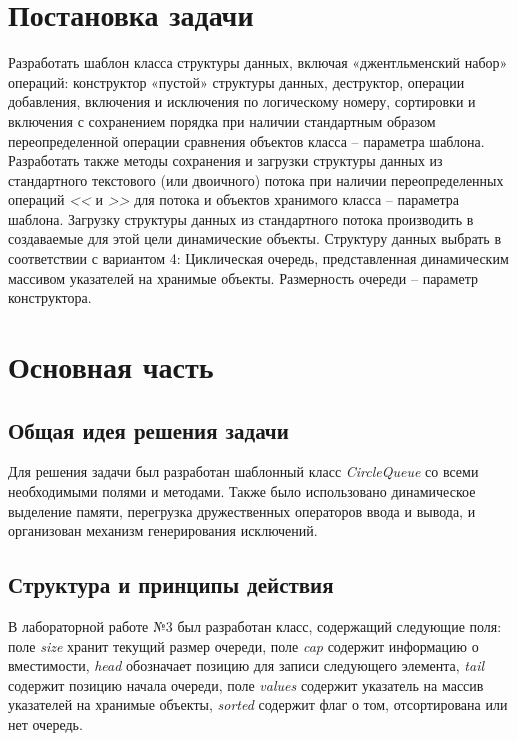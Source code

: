 \documentclass[a4paper,14pt]{article}
\begin{document}

\setcounter{page}{2} %

\renewcommand\contentsname{\centering {\normalsize Содержание}}
\tableofcontents
\newpage

\section*{Постановка задачи}

Разработать шаблон класса структуры данных, включая «джентльменский набор» операций: конструктор «пустой» структуры данных, деструктор, операции добавления, включения и исключения по логическому номеру, сортировки и включения с сохранением порядка при наличии стандартным образом переопределенной операции сравнения объектов класса – параметра шаблона. Разработать также методы сохранения и загрузки структуры данных из стандартного текстового (или двоичного) потока при
наличии переопределенных операций \textit{<<} и \textit{>>} для потока и объектов хранимого класса – параметра шаблона. Загрузку структуры данных из стандартного потока производить в создаваемые для этой цели динамические объекты. Структуру данных выбрать в соответствии с вариантом 4: Циклическая очередь, представленная динамическим массивом указателей на хранимые объекты. Размерность очереди – параметр конструктора.

\newpage

\section{Основная часть}
\subsection{Общая идея решения задачи}
Для решения задачи был разработан шаблонный класс \textit{CircleQueue} со всеми необходимыми полями и методами. Также было использовано динамическое выделение памяти, перегрузка дружественных операторов ввода и вывода, и организован механизм генерирования исключений.
\subsection{Структура и принципы действия}
В лабораторной работе №3 был разработан класс, содержащий следующие поля: поле \textit{size} хранит текущий размер очереди, поле \textit{cap} содержит информацию о вместимости, \textit{head} обозначает позицию для записи следующего элемента, \textit{tail} содержит позицию начала очереди, поле \textit{values} содержит указатель на массив указателей на хранимые объекты, \textit{sorted} содержит флаг о том, отсортирована или нет очередь.
\end{document}
